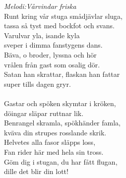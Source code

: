 {\footnotesize\textit{Melodi:Vårvindar friska}}\\
\vspace{10pt}
Runt kring vår stuga smådjävlar sluga,\\
tassa så tyst med bockfot och svans.\\
Varulvar yla, isande kyla\\
sveper i dimma fanstygens dans.\\
Bäva, o broder, lyssna och hör\\
vrålen från gast som osalig dör.\\
Satan han skrattar, flaskan han fattar\\
super tills dagen gryr.\\
\\
Gastar och spöken skymtar i kröken,\\
döingar släpar ruttnar lik.\\
Benrangel skramla, spökhänder famla,\\
kväva din strupes rosslande skrik.\\
Helvetes alla fasor släpps loss,\\
Fan rider här med hela sin tross.\\
Göm dig i stugan, du har fått flugan,\\
dille det blir din lott!